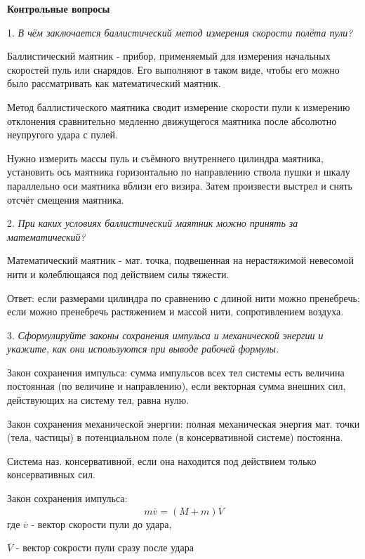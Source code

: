 \documentclass[12pt, letterpaper]{article}
\begin{document}
\begin{center}
\Large{\textbf{Контрольные вопросы}}\
\end{center}

1. \textit{В чём заключается баллистический метод измерения скорости полёта пули?}

Баллистический маятник - прибор, применяемый для измерения начальных скоростей пуль или снарядов. Его выполняют в таком виде, чтобы его можно было рассматривать как математический маятник.

Метод баллистического маятника сводит измерение скорости пули к измерению отклонения сравнительно медленно движущегося маятника после абсолютно неупругого удара с пулей.

Нужно измерить массы пуль и съёмного внутреннего цилиндра маятника, установить ось маятника горизонтально по направлению ствола пушки и шкалу параллельно оси маятника вблизи его визира. Затем произвести выстрел и снять отсчёт смещения маятника.\newline

2. \textit{При каких условиях баллистический маятник можно принять за математический?}

Математический маятник - мат. точка, подвешенная на нерастяжимой невесомой нити и колеблющаяся под действием силы тяжести.

Ответ: если размерами цилиндра по сравнению с длиной нити можно пренебречь; если можно пренебречь растяжением и массой нити, сопротивлением воздуха. \newline

3. \textit{Сформулируйте законы сохранения импульса и механической энергии и укажите, как они используются при выводе рабочей формулы.}

Закон сохранения импульса: сумма импульсов всех тел системы есть величина постоянная (по величине и направлению), если векторная сумма внешних сил, действующих на систему тел, равна нулю.

Закон сохранения механической энергии: полная механическая энергия мат. точки (тела, частицы) в потенциальном поле (в консервативной системе) постоянна.

Система наз. консервативной, если она находится под действием только консервативных сил.

Закон сохранения импульса:
\[m\overline{v}=(M+m)\overline{V}\]
где \(\overline{v}\) - вектор скорости пули до удара,

\(\overline{V}\) - вектор сокрости пули сразу после удара
\end{document}
